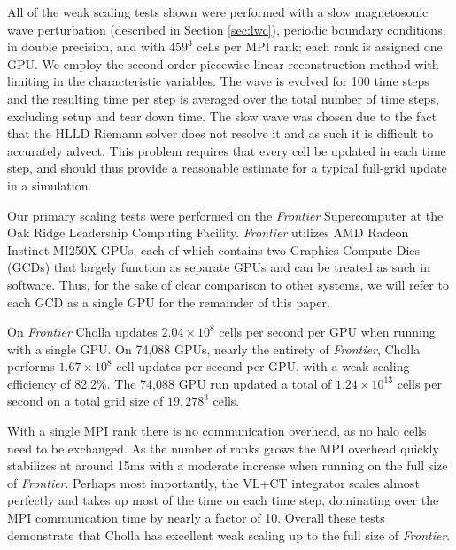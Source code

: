 \documentclass[modern, linenumbers]{aastex631}
\begin{document}
All of the weak scaling tests shown were performed with a slow magnetosonic wave perturbation (described in Section \ref{sec:lwc}), periodic boundary conditions, in double precision, and with $459^3$ cells per MPI rank; each rank is assigned one GPU. We employ the second order piecewise linear reconstruction method with limiting in the characteristic variables. The wave is evolved for 100 time steps and the resulting time per step is averaged over the total number of time steps, excluding setup and tear down time. The slow wave was chosen due to the fact that the HLLD Riemann solver does not resolve it and as such it is difficult to accurately advect. This problem requires that every cell be updated in each time step, and should thus provide a reasonable estimate for a typical full-grid update in a simulation.

Our primary scaling tests were performed on the \textit{Frontier} Supercomputer at the Oak Ridge Leadership Computing Facility. \textit{Frontier} utilizes AMD Radeon Instinct MI250X GPUs, each of which contains two Graphics Compute Dies (GCDs) that largely function as separate GPUs and can be treated as such in software. Thus, for the sake of clear comparison to other systems, we will refer to each GCD as a single GPU for the remainder of this paper.

On \textit{Frontier} Cholla updates $2.04\times10^8$ cells per second per GPU when running with a single GPU. On 74,088 GPUs, nearly the entirety of \textit{Frontier}, Cholla performs $1.67\times10^8$ cell updates per second per GPU, with a weak scaling efficiency of 82.2\%. The 74,088 GPU run updated a total of $1.24\times10^{13}$ cells per second on a total grid size of $19,278^3$ cells.

With a single MPI rank there is no communication overhead, as no halo cells need to be exchanged. As the number of ranks grows the MPI overhead quickly stabilizes at around 15ms with a moderate increase when running on the full size of \textit{Frontier}. Perhaps most importantly, the VL+CT integrator scales almost perfectly and takes up most of the time on each time step, dominating over the MPI communication time by nearly a factor of 10. Overall these tests demonstrate that Cholla has excellent weak scaling up to the full size of \textit{Frontier}.

\end{document}
